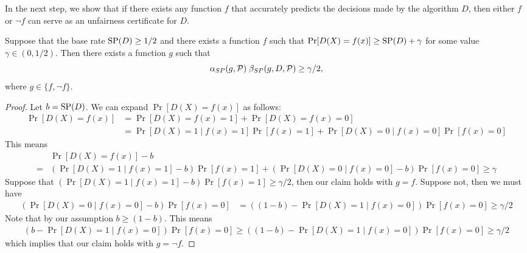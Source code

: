 In the next step, we show that if there exists any function $f$ that
accurately predicts the decisions made by the algorithm $D$, then
either $f$ or $\neg f$ can serve as an unfairness certificate for $D$.


\begin{lemma}\label{acc-dis}
  Suppose that the base rate $\mathrm{SP}(D) \geq 1/2$ and there exists
  a function $f$ such that
  $\Pr[D(X) = f(x)] \geq {\mathrm{SP}}(D) + \gamma$ for some value
  $\gamma \in (0, 1/2)$. Then there exists a function $g$ such that
 $$\alpha_{SP}(g, \mathcal{P}) \; \beta_{SP}(g, D, \mathcal{P}) \geq \gamma/2,$$ 
 where $g \in \{f, \neg f\}$.
\end{lemma}


\begin{proof}
  Let $b = {\mathrm{SP}}(D)$.  We can expand $\Pr[D(X) = f(x)]$ as
  follows:
  \begin{align*}
    \Pr[D(X) = f(x) ] &= \Pr[D(X) = f(x) = 1] +\Pr[D(X) =
                        f(x) = 0]\\
                      &= \Pr[D(X) = 1 \mid f(x) = 1]\Pr[f(x) = 1] + \Pr[D(X) = 0 \mid f(x) = 0] \Pr[f(x)=0]
  \end{align*}
  \noindent This means
  \begin{align*}
    &   \Pr[D(X) = f(x) ] - b \\= &\left(\Pr[D(X) = 1 \mid f(x) = 1] - b\right)\Pr[f(x) = 1] + \left(\Pr[D(X) = 0 \mid f(x) = 0] - b \right)\Pr[f(x)=0] \geq \gamma
  \end{align*}
  Suppose that
  $\left(\Pr[D(X) = 1 \mid f(x) = 1] - b\right)\Pr[f(x) = 1] \geq
  \gamma / 2$, then our claim holds with $g = f$.
  Suppose not, then we must have
  \begin{align*}
    \left(\Pr[D(X) = 0 \mid f(x) = 0] - b \right)\Pr[f(x)=0] &=  \left((1 - b) -\Pr[D(X) = 1 \mid f(x) = 0] \right)\Pr[f(x)=0]\geq \gamma/2
  \end{align*}
  Note that by our assumption $b\geq (1-b)$. This means
  \begin{align*}
    \left(b -\Pr[D(X) = 1 \mid f(x) = 0]
    \right)\Pr[f(x)=0]\geq     \left((1 - b) -\Pr[D(X) = 1 \mid f(x) = 0]
    \right)\Pr[f(x)=0]\geq \gamma/2
\end{align*}
which implies that our claim holds with $g = \neg f$.  
\end{proof}

